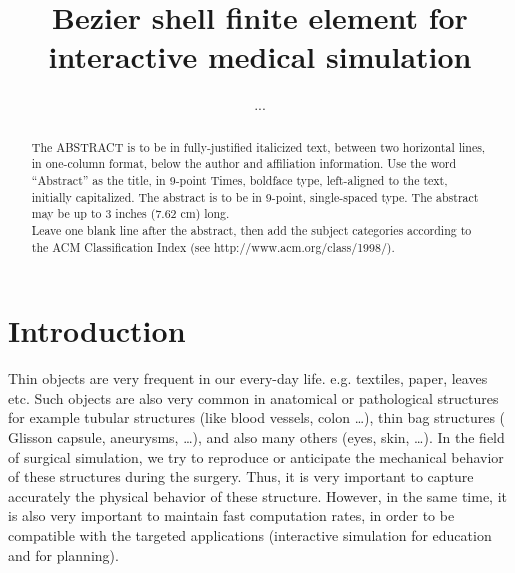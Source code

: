 \documentclass{egpubl}
\title[Short title]%
      {Bezier shell finite element for interactive medical simulation} %
\author[...]
       {...} %
\begin{document}

\maketitle

\begin{abstract} %
   The ABSTRACT is to be in fully-justified italicized text, 
   between two horizontal lines,
   in one-column format, 
   below the author and affiliation information. 
   Use the word ``Abstract'' as the title, in 9-point Times, boldface type, 
   left-aligned to the text, initially capitalized. 
   The abstract is to be in 9-point, single-spaced type.
   The abstract may be up to 3 inches (7.62 cm) long. \\
   Leave one blank line after the abstract, 
   then add the subject categories according to the ACM Classification Index 
   (see http://www.acm.org/class/1998/).

\begin{classification} %
\end{classification}

\end{abstract}






\section{Introduction} %

Thin objects are very frequent in our every-day life. %
e.g. textiles, paper, leaves etc. 
Such objects are also very common in anatomical or pathological structures for example tubular structures (like blood vessels, colon \ldots), thin bag structures (%
Glisson capsule, aneurysms,  \ldots), and also many others (eyes, skin, \ldots). 
In the field of surgical simulation, we try to reproduce or anticipate the mechanical behavior of these structures during the surgery.
Thus, it is very important to capture accurately the physical behavior of these structure.
However, in the same time, it is also very important to maintain fast computation rates, in order to be compatible with the targeted applications (interactive simulation for education and for planning).
\end{document}
